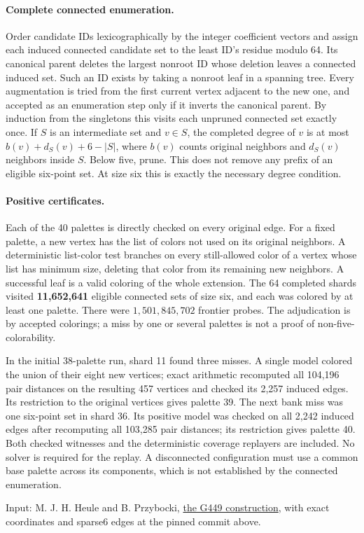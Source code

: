 \documentclass[10pt,letterpaper]{article}
\begin{document}
\paragraph{Complete connected enumeration.}
Order candidate IDs lexicographically by the integer coefficient
vectors and assign each induced connected candidate set to the
least ID's residue modulo 64. Its canonical parent deletes the
largest nonroot ID whose deletion leaves a connected induced
set. Such an ID exists by taking a nonroot leaf in a spanning
tree. Every augmentation is tried from the first current vertex
adjacent to the new one, and accepted as an enumeration step
only if it inverts the canonical parent. By induction from the
singletons this visits each unpruned connected set exactly once.
If \(S\) is an intermediate set and \(v\in S\), the completed
degree of \(v\) is at most \(b(v)+d_S(v)+6-|S|\), where
\(b(v)\) counts original neighbors and \(d_S(v)\) neighbors
inside \(S\). Below five, prune. This does not remove any prefix
of an eligible six-point set. At size six this is exactly the
necessary degree condition.

\paragraph{Positive certificates.}
Each of the 40 palettes is directly checked on every original edge.
For a fixed palette, a new vertex has the list of colors not used on
its original neighbors. A deterministic list-color test branches
on every still-allowed color of a vertex whose list has minimum
size, deleting that color from its remaining new neighbors.
A successful leaf is a valid coloring of the whole extension.
The 64 completed shards visited \textbf{11,652,641} eligible
connected sets of size six, and each was colored by at least one
palette. There were \(1{,}501{,}845{,}702\) frontier probes.
The adjudication is by accepted colorings; a miss by one or
several palettes is not a proof of non-five-colorability.

In the initial 38-palette run, shard 11 found three misses. A single
model colored the union of their eight new vertices; exact arithmetic
recomputed all 104,196 pair distances on the resulting 457 vertices
and checked its 2,257 induced edges. Its restriction to the original
vertices gives palette 39. The next bank miss was one six-point
set in shard 36. Its positive model was checked on all 2,242 induced
edges after recomputing all 103,285 pair distances; its restriction
gives palette 40. Both checked witnesses and the deterministic
coverage replayers are included. No solver is required for the
replay. A disconnected configuration must use a common base
palette across its components, which is not established by the
connected enumeration.

\medskip
\noindent Input: M. J. H. Heule and B. Przybocki,
\href{https://arxiv.org/abs/2611.28518}{the G449 construction},
with exact coordinates and sparse6 edges at the pinned commit above.
\end{document}
